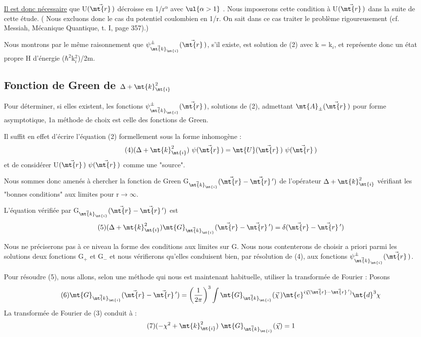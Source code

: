 \ul{Il est donc nécessaire} que U$(\vec{\mt{r}}\,)$ décroisse en 1/r$^\alpha$ avec
$\ul{\alpha>1}$ . Nous imposerons cette condition à U$(\vec{\mt{r}}\,)$ dans la suite de cette
étude. ({\footnotesize 
Nous excluons donc le cas du potentiel coulombien en 1/r. On sait
dans ce cas traiter le problème rigoureusement (cf. Messiah, Mécanique Quantique, t. I, page 357).})

Nous montrons par le même raisonnement que $\psi_{\vec{\mt{k}}_\mt{i}}^\pm(\vec{\mt{r}}\,)$, s'il
existe, est solution de (2) avec k = k$_i$, et représente donc un état propre H d'énergie ($\hbar^2$k$_i^2$)/2m.

\subsection{Fonction de Green de $\Delta+\mt{k}_\mt{i}^2$}%
Pour déterminer, si elles existent, les fonctions $\psi_{\vec{\mt{k}}_\mt{i}}^\pm(\vec{\mt{r}}\,)$,
solutions de (2), admettant $\mt{A}_\pm(\vec{\mt{r}}\,)$ pour forme  asymptotique, 1a méthode
de choix est celle des fonctions de Green.

Il suffit en effet d'écrire l'équation (2) formellement
sous la forme inhomogène :
\[
\tag{4}(\Delta+\mt{k}_\mt{i}^2)\ \psi(\vec{\mt{r}}\,)=\mt{U}(\vec{\mt{r}}\,)\ \psi(\vec{\mt{r}}\,)
\]
et de considérer U$(\vec{\mt{r}}\,)\ \psi(\vec{\mt{r}}\,)$ comme une "source".

Nous sommes donc amenés à chercher la fonction de Green
G$_{\vec{\mt{k}}_\mt{i}}(\vec{\mt{r}}-\vec{\mt{r}}\,')$
de l'opérateur $\Delta+\mt{k}_\mt{i}^2$ vérifiant les "bonnes conditions"
aux limites pour r$\to\infty$.

L'équation vérifiée par G$_{\vec{\mt{k}}_\mt{i}}(\vec{\mt{r}}-\vec{\mt{r}}\,')$ est
\[
\tag{5}(\Delta+\mt{k}_\mt{i}^2)\mt{G}_{\vec{\mt{k}}_\mt{i}}(\vec{\mt{r}}-\vec{\mt{r}}\,')=\delta(\vec{\mt{r}}-\vec{\mt{r}}\,')
\]

Nous ne préciserons pas à ce niveau la forme des conditions aux limites sur G.
Nous nous contenterons de choisir a priori parmi
les solutions deux fonctions G$_+$ et G$_-$ et nous vérifierons qu'elles conduisent
bien, par résolution de (4), aux fonctions $\psi_{\vec{\mt{k}}_\mt{i}}^\pm(\vec{\mt{r}}\,)$.

Pour résoudre (5), nous allons, selon une méthode qui nous
est maintenant habituelle, utiliser la transformée de Fourier : Posons
\[
\tag{6}\mt{G}_{\vec{\mt{k}}_\mt{i}}(\vec{\mt{r}}-\vec{\mt{r}}\,')=\left(\frac{1}{2\pi}\right)^3
\int \mt{G}_{\vec{\mt{k}}_\mt{i}}(\vec{\chi}\,)\mt{e}^{i\vec{\chi}(\vec{\mt{r}}-\vec{\mt{r}}\,')}\mt{d}^3\chi
\]
La transformée de Fourier de (3) conduit à :
\[
\tag{7}(-\chi^2+\mt{k}_\mt{i}^2)\ \mt{G}_{\vec{\mt{k}}_\mt{i}}(\vec{\chi})=1
\]

